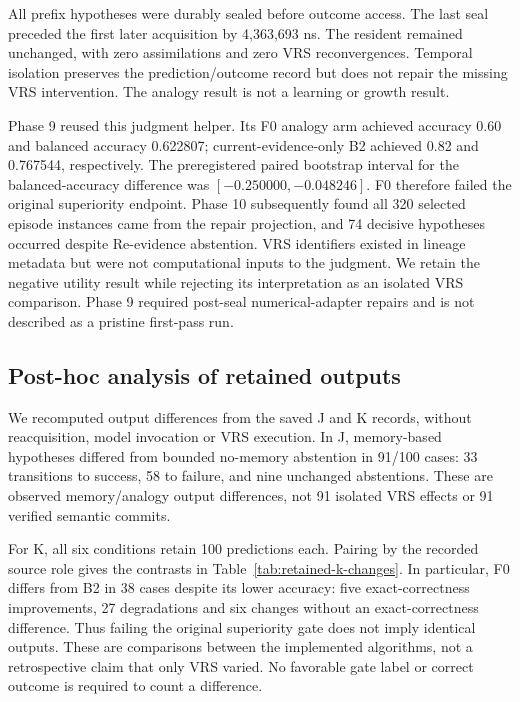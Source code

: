 \documentclass[11pt]{article}
\newcommand{\vrs}{VRS}
\begin{document}
All prefix hypotheses were durably sealed before outcome access. The last seal preceded the first later acquisition by 4,363,693 ns. The resident remained unchanged, with zero assimilations and zero \vrs{} reconvergences. Temporal isolation preserves the prediction/outcome record but does not repair the missing VRS intervention. The analogy result is not a learning or growth result.

Phase 9 reused this judgment helper. Its F0 analogy arm achieved accuracy 0.60 and balanced accuracy 0.622807; current-evidence-only B2 achieved 0.82 and 0.767544, respectively. The preregistered paired bootstrap interval for the balanced-accuracy difference was $[-0.250000,-0.048246]$. F0 therefore failed the original superiority endpoint. Phase 10 subsequently found all 320 selected episode instances came from the repair projection, and 74 decisive hypotheses occurred despite Re-evidence abstention. VRS identifiers existed in lineage metadata but were not computational inputs to the judgment. We retain the negative utility result while rejecting its interpretation as an isolated VRS comparison. Phase 9 required post-seal numerical-adapter repairs and is not described as a pristine first-pass run.

\subsection{Post-hoc analysis of retained outputs}

We recomputed output differences from the saved J and K records, without reacquisition, model invocation or VRS execution. In J, memory-based hypotheses differed from bounded no-memory abstention in 91/100 cases: 33 transitions to success, 58 to failure, and nine unchanged abstentions. These are observed memory/analogy output differences, not 91 isolated VRS effects or 91 verified semantic commits.

For K, all six conditions retain 100 predictions each. Pairing by the recorded source role gives the contrasts in Table~\ref{tab:retained-k-changes}. In particular, F0 differs from B2 in 38 cases despite its lower accuracy: five exact-correctness improvements, 27 degradations and six changes without an exact-correctness difference. Thus failing the original superiority gate does not imply identical outputs. These are comparisons between the implemented algorithms, not a retrospective claim that only VRS varied. No favorable gate label or correct outcome is required to count a difference.
\end{document}
